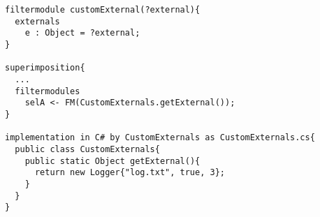 \begin{lstlisting}[caption = {A filtermodule with a unique external}, label = lst::ARM:fmp:comment1,
style = listing, language = composestarNew, float = tpb]
filtermodule customExternal(?external){
  externals
    e : Object = ?external;
}

superimposition{
  ...
  filtermodules
    selA <- FM(CustomExternals.getExternal());
}

implementation in C# by CustomExternals as CustomExternals.cs{
  public class CustomExternals{
    public static Object getExternal(){
      return new Logger{"log.txt", true, 3};
    }  
  }
}
\end{lstlisting}